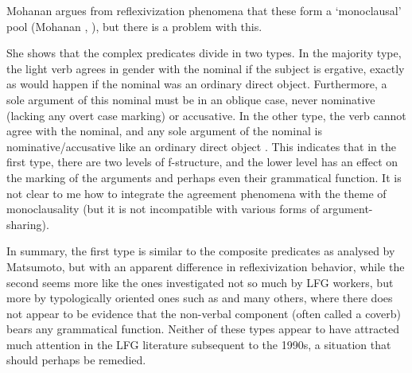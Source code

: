 \documentclass[output=paper,hidelinks]{langscibook}
\begin{document}
Mohanan argues from reflexivization phenomena that these form a `monoclausal' pool (Mohanan
\citeyear[281]{MohananT1994}, \citeyear[443--444]{MohananT1997}),
but there is a problem with this.

She shows that the complex predicates divide in two types.  In the majority type, the light
verb agrees in gender with the nominal if the subject is ergative, exactly as would happen
if the nominal was an ordinary direct object.  Furthermore, a sole argument of this nominal
must be in an oblique case, never nominative (lacking any overt case marking) or accusative.  In the other type, the
verb cannot agree with the nominal, and any sole argument of the nominal is nominative/accusative
like an ordinary direct object \citep[457--469]{MohananT1997}.  This indicates that in the first
type, there are two levels of f-structure, and the lower level has an effect on the marking
of the arguments and perhaps even their grammatical function.  It is not clear to me how
to integrate the agreement phenomena with the theme of monoclausality (but it is not incompatible with various forms
of argument-sharing).

In summary, the first type is similar to the composite predicates as analysed by Matsumoto, but
with an apparent difference in reflexivization behavior, while the second seems more like
the ones investigated not so much by LFG workers, but more by typologically oriented ones such as
\citet{Schulze-Berndt2000} and many others, where there does not appear to be evidence that
the non-verbal component (often called a coverb) bears any grammatical function.  Neither
of these types appear to have attracted much attention in the LFG literature subsequent to the
1990s, a situation that should perhaps be remedied.
\end{document}
